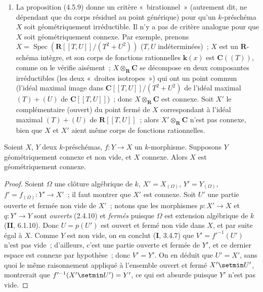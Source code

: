 \begin{remarks}[4.5.12]
\begin{enumerate}
\item[(ii)] La proposition (4.5.9) donne un critère «~birationnel~» (autrement
dit, ne dépendant que du corps résiduel au point générique) pour qu'un
$k$-préschéma $X$ soit géométriquement irréductible. Il n'y a pas de critère
analogue pour que $X$ soit géométriquement connexe. Par exemple, prenons
$X=\operatorname{Spec}(\mathbf R[[T,U]]/(T^2+U^2))$ ($T,U$ indéterminées)~;
$X$ est un $\mathbf R$-schéma intègre, et son corps de fonctions rationnelles
$\boldsymbol{k}(x)$ est $\mathbf C((T))$, comme on le vérifie aisément~; $X\otimes_{\mathbf
R}\mathbf C$ se décompose en deux composantes irréductibles (les deux
«~droites isotropes~») qui ont un point commun (l'idéal maximal image dans
$\mathbf C[[T,U]]/(T^2+U^2)$ de l'idéal maximal $(T)+(U)$ de
$\mathbf C[[T,U]]$)~; donc $X\otimes_{\mathbf R}\mathbf C$ est connexe. Soit
$X'$ le complémentaire (ouvert) du point fermé de $X$ correspondant à l'idéal
maximal $(T)+(U)$ de $\mathbf R[[T,U]]$~; alors $X'\otimes_{\mathbf R}\mathbf C$
n'est pas connexe, bien que $X$ et $X'$ aient même corps de fonctions
rationnelles.
\end{enumerate}
\end{remarks}

\begin{proposition}[4.5.13]
\label{IV.2.4.5.13-fr}
Soient $X$, $Y$ deux $k$-préschémas, $f:Y\to X$ un $k$-morphisme. Supposons
$Y$ géométriquement connexe et non vide, et $X$ connexe. Alors $X$ est
géométriquement connexe.
\end{proposition}

\begin{proof}
Soient $\Omega$ une clôture algébrique de $k$, $X'=X_{(\Omega)}$,
$Y'=Y_{(\Omega)}$, $f'=f_{(\Omega)}:Y'\to X'$~; il faut montrer que $X'$ est
connexe. Soit $U'$ une partie ouverte et fermée non vide de $X'$~; notons que
les morphismes $p:X'\to X$ et $q:Y'\to Y$ sont \emph{ouverts} (2.4.10) et
\emph{fermés} puisque $\Omega$ est extension algébrique de $k$ (\textbf{II}, 6.1.10).
Donc $U=p(U')$ est ouvert et fermé non vide dans $X$, et par suite égal à $X$.
Comme $Y$ est non vide, on en conclut (\textbf{I}, 3.4.7) que
$V'=f'^{-1}(U')$ n'est pas vide~; d'ailleurs, c'est une partie ouverte et
fermée de $Y'$, et ce dernier espace est connexe par hypothèse~; donc $V'=Y'$.
On en déduit que $U'=X'$, sans quoi le même raisonnement appliqué à l'ensemble
ouvert et fermé $X'\setmin U'$, montrerait que $f'^{-1}(X'\setmin U')=Y'$, ce qui est absurde
puisque $Y'$ n'est pas vide.
\end{proof}

